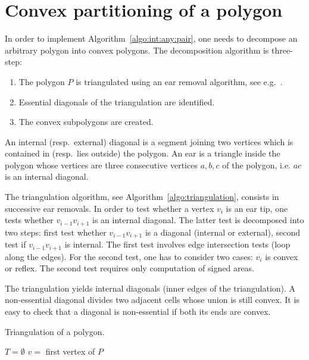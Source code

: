 \section{Convex partitioning of a polygon }
\label{sec:decompo}

In order to implement Algorithm~\ref{algo:int:any:pair}, one needs to
decompose an arbitrary polygon into convex polygons. The decomposition
algorithm is three-step:
\begin{enumerate}
\item The polygon $P$ is triangulated using an ear removal algorithm,
  see e.g.\ \cite[Section 1.6]{ORourke:1998}.
\item Essential diagonals of the triangulation are identified.
\item The convex subpolygons are created.
\end{enumerate}
An internal (resp.\ external) diagonal is a segment joining two
vertices which is contained in (resp.\ lies outside) the polygon. An
ear is a triangle inside the polygon whose vertices are three
consecutive vertices $a,b,c$ of the polygon, i.e. $ac$ is an internal
diagonal. 

The triangulation algorithm, see Algorithm~\ref{algo:triangulation},
consists in successive ear removals. In order to test whether a vertex
$v_i$ is an ear tip, one tests whether $v_{i-1}v_{i+1}$ is an internal
diagonal. The latter test is decomposed into two steps: first test
whether $v_{i-1}v_{i+1}$ is a diagonal (internal or external), second
test if $v_{i-1}v_{i+1}$ is internal. The first test involves edge
intersection tests (loop along the edges). For the second test, one
has to consider two cases:  $v_{i}$ is convex or reflex. The second
test requires only computation of signed areas.


The triangulation yields internal diagonals (inner edges of the
triangulation). 
A non-essential diagonal divides two adjacent cells
whose union is still convex. It is easy to check that a diagonal is
non-essential if both  its ends are convex. 



\begin{algorithm}[tbph]
  \caption{Triangulation of a polygon.}
  \label{algo:triangulation}
  $T=\emptyset$\;
  $v=$ first vertex of $P$\;
\end{algorithm}

